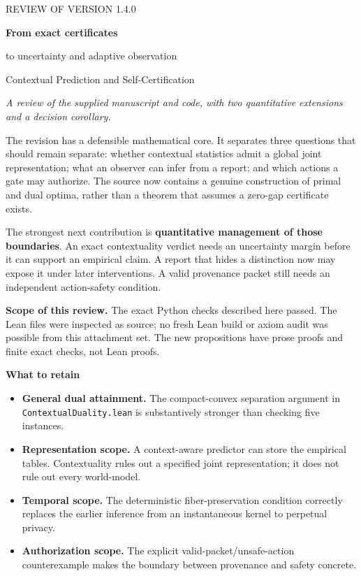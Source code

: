 \documentclass[11pt,letterpaper]{article}
\newcommand{\sect}[1]{\vspace{3pt}{\Large\sffamily\bfseries\color{ink}#1}\par\vspace{3pt}}
\newcommand{\sub}[1]{{\bfseries\color{ink}#1}\par}
\newcommand{\note}[1]{\par\vspace{3pt}\noindent\colorbox{pale}{\parbox{\dimexpr\linewidth-2\fboxsep}{#1}}\par\vspace{3pt}}
\newcommand{\code}[1]{\texttt{\small #1}}
\begin{document}
{\small\sffamily\color{teal}REVIEW OF VERSION 1.4.0}\par
{\LARGE\sffamily\bfseries\color{ink}From exact certificates\par to uncertainty and adaptive observation\par}
\vspace{4pt}
{\large Contextual Prediction and Self-Certification}\par
\textit{A review of the supplied manuscript and code, with two quantitative extensions and a decision corollary.}

\sect{Assessment}
The revision has a defensible mathematical core. It separates three questions that should remain separate: whether contextual statistics admit a global joint representation; what an observer can infer from a report; and which actions a gate may authorize. The source now contains a genuine construction of primal and dual optima, rather than a theorem that assumes a zero-gap certificate exists.

The strongest next contribution is \textbf{quantitative management of those boundaries}. An exact contextuality verdict needs an uncertainty margin before it can support an empirical claim. A report that hides a distinction now may expose it under later interventions. A valid provenance packet still needs an independent action-safety condition.

\note{\textbf{Scope of this review.} The exact Python checks described here passed. The Lean files were inspected as source; no fresh Lean build or axiom audit was possible from this attachment set. The new propositions have prose proofs and finite exact checks, not Lean proofs.}

\sub{What to retain}
\begin{itemize}
\item \textbf{General dual attainment.} The compact-convex separation argument in \code{ContextualDuality.lean} is substantively stronger than checking five instances.
\item \textbf{Representation scope.} A context-aware predictor can store the empirical tables. Contextuality rules out a specified joint representation; it does not rule out every world-model.
\item \textbf{Temporal scope.} The deterministic fiber-preservation condition correctly replaces the earlier inference from an instantaneous kernel to perpetual privacy.
\item \textbf{Authorization scope.} The explicit valid-packet/unsafe-action counterexample makes the boundary between provenance and safety concrete.
\end{itemize}
\end{document}
